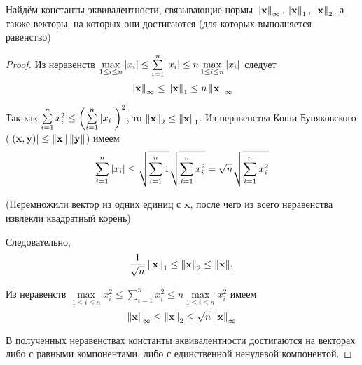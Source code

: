 \begin{example}
  Найдём константы эквивалентности, связывающие нормы $\left\lVert\mathbf{x}\right\rVert_{\infty}, \left\lVert\mathbf{x}\right\rVert_{1}, \left\lVert\mathbf{x}\right\rVert_{2}$, а также векторы, на которых они достигаются (для которых выполняется равенство)
  \begin{proof}

    Из неравенств $\max\limits_{1 \le i \le n} \left\lvert x_i\right\rvert \le \sum\limits_{i=1}^{n} \left\lvert x_i\right\rvert \le n \max\limits_{1 \le i \le n} \left\lvert x_i\right\rvert$ следует
    $$
      \left\lVert\mathbf{x}\right\rVert_{\infty} \le \left\lVert\mathbf{x}\right\rVert_{1} \le n \left\lVert\mathbf{x}\right\rVert_{\infty}
    $$

    Так как $\sum\limits_{i=1}^{n} x_i^2 \le \left( \sum\limits_{i=1}^{n} \left\lvert x_i\right\rvert \right)^2$, то $\left\lVert\mathbf{x}\right\rVert_{2}  \le \left\lVert\mathbf{x}\right\rVert_{1}$. Из неравенства Коши-Буняковского ($\left\lvert(\mathbf{x}, \mathbf{y})\right\rvert \le \left\lVert\mathbf{x}\right\rVert \left\lVert\mathbf{y}\right\rVert$) имеем
    $$
      \sum_{i=1}^{n} \left\lvert x_i\right\rvert \le \sqrt{\sum_{i=1}^{n} 1} \sqrt{\sum_{i=1}^{n} x_i^2} = \sqrt{n} \sqrt{\sum_{i=1}^{n} x_i^2}
    $$

    (Перемножили вектор из одних единиц с $\mathbf{x}$, после чего из всего неравенства извлекли квадратный корень)

    Следовательно,
    $$
      \frac{1}{\sqrt{n}} \left\lVert\mathbf{x}\right\rVert_{1} \le \left\lVert\mathbf{x}\right\rVert_{2} \le \left\lVert\mathbf{x}\right\rVert_{1}
    $$

    Из неравенств $\max\limits_{1 \le i \le n} x_i^2 \le \sum\limits_{i=1}^{n} x_i^2 \le n \max\limits_{1 \le i \le n} x_i^2$ имеем
    $$
      \left\lVert\mathbf{x}\right\rVert_{\infty} \le \left\lVert\mathbf{x}\right\rVert_{2} \le \sqrt{n}\left\lVert\mathbf{x}\right\rVert_{\infty}
    $$

    В полученных неравенствах константы эквивалентности достигаются на векторах либо с равными компонентами, либо с единственной ненулевой компонентой.
  \end{proof}
\end{example}

